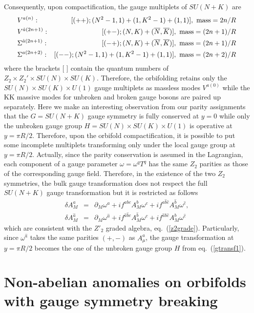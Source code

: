 \documentclass[a4paper,12pt]{article}
\begin{document}
Consequently, upon compactification, the gauge multiplets of
$SU(N+K)$ are
\begin{eqnarray}
&V^{a(n)}:&[(++);(N^2-1,1)+(1,K^2-1)
+(1,1)],\ {\rm mass}=2n/R \\
&V^{{\hat a}(2n+1)}:&[(+-);(N,K)
+(\overline{N},\overline{K})],
\ {\rm mass}=(2n+1)/R \\
&\Sigma^{{\hat a}(2n+1)}:&[(-+);(N,K)
+(\overline{N},\overline{K})],
\ {\rm mass}=(2n+1)/R \\
&\Sigma^{a(2n+2)}:&[(--);(N^2-1,1)+(1,K^2-1)
+(1,1)],
\ {\rm mass}=(2n+2)/R
\end{eqnarray}
where the brackets [ ] contain the quantum numbers of $Z_2\times
Z_2'\times SU(N)\times SU(K)$. Therefore, the orbifolding retains
only the $SU(N)\times SU(K)\times U(1)$ gauge multiplets as
massless modes $V^{a(0)}$ while the KK massive modes for unbroken
and broken gauge bosons are paired up separately. Here we make an
interesting observation from our parity assignments that the
$G=SU(N+K)$ gauge symmetry is fully conserved at $y=0$ while only
the unbroken gauge group $H=SU(N)\times SU(K)\times U(1)$ is
operative at $y=\pi R/2$. Therefore, upon the
orbifold compactification, it is possible to put some incomplete
multiplets transforming only under the local gauge group at $y=\pi R/2$.
Actually, since the parity conservation is assumed in the Lagrangian,
each component of a gauge parameter $\omega=\omega^q T^q$ has the same $Z_2$ 
parities as those of the corresponding gauge field.
Therefore, in the existence of the two $Z_2$ symmetries, 
the bulk gauge transformation does not respect the full $SU(N+K)$ 
gauge transformation but it is restricted as follows 
\begin{eqnarray}
\delta A^a_M&=&\partial_M \omega^a+if^{abc}A^b_M \omega^c
+if^{a{\hat b}{\hat c}} A^{\hat b}_M\omega^{\hat c}, \label{gtransf1}\\
\delta A^{\hat a}_M &=&\partial_M \omega^{\hat a}+if^{{\hat a}{\hat b}c}
A^{\hat b}_M\omega^{c}+if^{{\hat a}b{\hat c}}A^b_M\omega^{\hat c}
\label{gtransf2}
\end{eqnarray} 
which are consistent with the $Z'_2$ graded algebra, eq.~(\ref{z2grade}).  
Particularly, since $\omega^{\hat a}$ takes the same parities $(+,-)$ 
as $A^{\hat a}_\mu$, the gauge transformation at $y=\pi R/2$ becomes the one
of the unbroken gauge group $H$ from eq.~(\ref{gtransf1}). 



\section{Non-abelian anomalies on orbifolds with gauge symmetry breaking}
\end{document}
